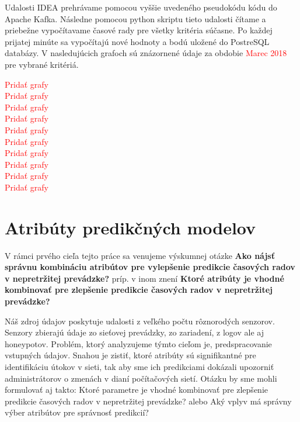 \documentclass[thesismargins, thesislinespacing, openright, upjsfrontpage, combineabstracts]{rnthesis}
\begin{document}
Udalosti IDEA prehrávame pomocou vyššie uvedeného pseudokódu kódu do Apache Kafka. Následne pomocou python skriptu tieto udalosti čítame a priebežne vypočítavame časové rady pre všetky kritéria súčasne. Po každej prijatej minúte sa vypočítajú nové hodnoty a bodú uložené do PostreSQL databázy. V nasledujúcich grafoch sú znázornené údaje za obdobie \textcolor{red}{Marec 2018} pre vybrané kritériá.

\textcolor{red}{Pridať grafy}\\
\textcolor{red}{Pridať grafy}\\
\textcolor{red}{Pridať grafy}\\
\textcolor{red}{Pridať grafy}\\
\textcolor{red}{Pridať grafy}\\
\textcolor{red}{Pridať grafy}\\
\textcolor{red}{Pridať grafy}\\
\textcolor{red}{Pridať grafy}\\
\textcolor{red}{Pridať grafy}\\
\textcolor{red}{Pridať grafy}

\section{Atribúty predikčných modelov}
V rámci prvého cieľa tejto práce sa venujeme výskumnej otázke \textbf{Ako nájsť správnu kombináciu atribútov pre vylepšenie predikcie časových radov v nepretržitej prevádzke?} príp. v inom znení \textbf{Ktoré atribúty je vhodné kombinovať pre zlepšenie predikcie časových radov v nepretržitej prevádzke?}

Náš zdroj údajov poskytuje udalosti z veľkého počtu rôznorodých senzorov. Senzory zbierajú údaje zo sieťovej prevádzky, zo zariadení, z logov ale aj honeypotov. Problém, ktorý analyzujeme týmto cieľom je, predspracovanie vstupných údajov. Snahou je zistiť, ktoré atribúty sú signifikantné pre identifikáciu útokov v sieti, tak aby sme ich predikciami dokázali upozorniť administrátorov o zmenách v dianí počítačových sietí. Otázku by sme mohli formulovať aj takto: Ktoré parametre je vhodné kombinovať pre zlepšenie predikcie časových radov v nepretržitej prevádzke? alebo Aký vplyv má správny výber atribútov pre správnosť predikcií?

\end{document}
